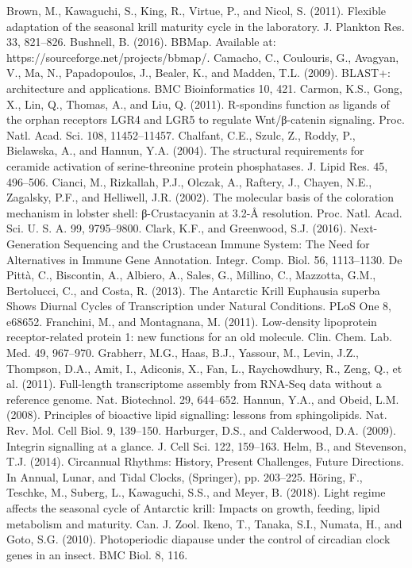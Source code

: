 Brown, M., Kawaguchi, S., King, R., Virtue, P., and Nicol, S. (2011). Flexible adaptation of the seasonal krill maturity cycle in the laboratory. J. Plankton Res. 33, 821–826.
Bushnell, B. (2016). BBMap. Available at: https://sourceforge.net/projects/bbmap/.
Camacho, C., Coulouris, G., Avagyan, V., Ma, N., Papadopoulos, J., Bealer, K., and Madden, T.L. (2009). BLAST+: architecture and applications. BMC Bioinformatics 10, 421.
Carmon, K.S., Gong, X., Lin, Q., Thomas, A., and Liu, Q. (2011). R-spondins function as ligands of the orphan receptors LGR4 and LGR5 to regulate Wnt/β-catenin signaling. Proc. Natl. Acad. Sci. 108, 11452–11457.
Chalfant, C.E., Szulc, Z., Roddy, P., Bielawska, A., and Hannun, Y.A. (2004). The structural requirements for ceramide activation of serine-threonine protein phosphatases. J. Lipid Res. 45, 496–506.
Cianci, M., Rizkallah, P.J., Olczak, A., Raftery, J., Chayen, N.E., Zagalsky, P.F., and Helliwell, J.R. (2002). The molecular basis of the coloration mechanism in lobster shell: β-Crustacyanin at 3.2-Å resolution. Proc. Natl. Acad. Sci. U. S. A. 99, 9795–9800.
Clark, K.F., and Greenwood, S.J. (2016). Next-Generation Sequencing and the Crustacean Immune System: The Need for Alternatives in Immune Gene Annotation. Integr. Comp. Biol. 56, 1113–1130.
De Pittà, C., Biscontin, A., Albiero, A., Sales, G., Millino, C., Mazzotta, G.M., Bertolucci, C., and Costa, R. (2013). The Antarctic Krill Euphausia superba Shows Diurnal Cycles of Transcription under Natural Conditions. PLoS One 8, e68652.
Franchini, M., and Montagnana, M. (2011). Low-density lipoprotein receptor-related protein 1: new functions for an old molecule. Clin. Chem. Lab. Med. 49, 967–970.
Grabherr, M.G., Haas, B.J., Yassour, M., Levin, J.Z., Thompson, D.A., Amit, I., Adiconis, X., Fan, L., Raychowdhury, R., Zeng, Q., et al. (2011). Full-length transcriptome assembly from RNA-Seq data without a reference genome. Nat. Biotechnol. 29, 644–652.
Hannun, Y.A., and Obeid, L.M. (2008). Principles of bioactive lipid signalling: lessons from sphingolipids. Nat. Rev. Mol. Cell Biol. 9, 139–150.
Harburger, D.S., and Calderwood, D.A. (2009). Integrin signalling at a glance. J. Cell Sci. 122, 159–163.
Helm, B., and Stevenson, T.J. (2014). Circannual Rhythms: History, Present Challenges, Future Directions. In Annual, Lunar, and Tidal Clocks, (Springer), pp. 203–225.
Höring, F., Teschke, M., Suberg, L., Kawaguchi, S.S., and Meyer, B. (2018). Light regime affects the seasonal cycle of Antarctic krill: Impacts on growth, feeding, lipid metabolism and maturity. Can. J. Zool.
Ikeno, T., Tanaka, S.I., Numata, H., and Goto, S.G. (2010). Photoperiodic diapause under the control of circadian clock genes in an insect. BMC Biol. 8, 116.
